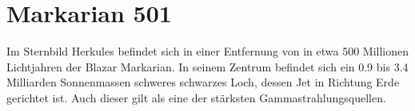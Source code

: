\section{Markarian 501}
Im Sternbild Herkules befindet sich in einer Entfernung von in etwa 500 Millionen Lichtjahren der Blazar Markarian. 
In seinem Zentrum befindet sich ein \num{0.9} bis \num{3.4} Milliarden Sonnenmassen schweres schwarzes Loch, dessen Jet in Richtung Erde gerichtet ist.
Auch dieser gilt als eine der stärksten Gammastrahlungsquellen.
